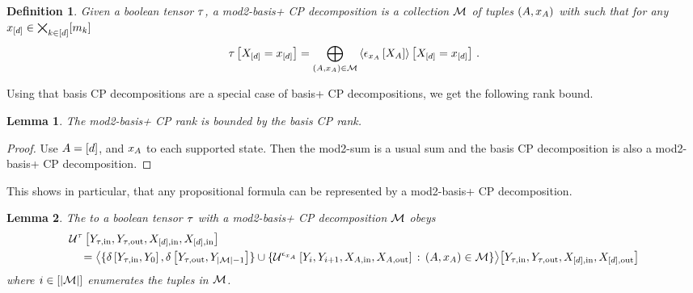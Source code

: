 \documentclass[aps,onecolumn,nofootinbib,pra]{article}
\newtheorem{lemma}{Lemma}
\newtheorem{definition}{Definition}
\begin{document}
    \begin{definition}
        Given a boolean tensor $\tau$, a mod2-basis+ CP decomposition is a collection $\mathcal{M}$ of tuples $(A,x_{A})$ with such that for any $x_{[d]}\in\bigtimes_{k\in[d]}[m_{k}]$
        \begin{align*}
            \tau\left[X_{[d]}=x_{[d]}\right]
            = \bigoplus_{(A,x_{A})\in\mathcal{M}} \left\langle \epsilon_{x_{A}}\left[X_{A}\right]\right\rangle \left[ X_{[d]}=x_{[d]} \right] \, .
        \end{align*}
    \end{definition}

    Using that basis CP decompositions are a special case of basis+ CP decompositions, we get the following rank bound.

    \begin{lemma}
        The mod2-basis+ CP rank is bounded by the basis CP rank.
    \end{lemma}
    \begin{proof}
        Use $A=[d]$, and $x_{A}$ to each supported state.
        Then the mod2-sum is a usual sum and the basis CP decomposition is also a mod2-basis+ CP decomposition.
    \end{proof}

    This shows in particular, that any propositional formula can be represented by a mod2-basis+ CP decomposition.

    \begin{lemma}
        The \computationCircuit{} to a boolean tensor $\tau$ with a mod2-basis+ CP decomposition $\mathcal{M}$ obeys
        \begin{align*}
            &\mathcal{U}^{\tau}\left[
                Y_{\tau,\mathrm{in}},Y_{\tau,\mathrm{out}},X_{[d],\mathrm{in}},X_{[d],\mathrm{in}}
            \right] \\
            & \quad =
            \big\langle 
                \{\delta\left[Y_{\tau,\mathrm{in}},Y_{0}\right],\delta\left[Y_{\tau,\mathrm{out}},Y_{\left|\mathcal{M}\right|-1}\right]\} \cup
                \{\mathcal{U}^{\epsilon_{x_{A}}}\left[
                    Y_{i}, Y_{i+1},
                    X_{A,\mathrm{in}},X_{A,\mathrm{out}}\right] \,:\, (A,x_{A})\in\mathcal{M}\}
             \big\rangle \big[ Y_{\tau,\mathrm{in}},Y_{\tau,\mathrm{out}},X_{[d],\mathrm{in}},X_{[d],\mathrm{out}} \big]
        \end{align*}
        where $i\in[\left|\mathcal{M}\right|]$ enumerates the tuples in $\mathcal{M}$.
    \end{lemma}
\end{document}
